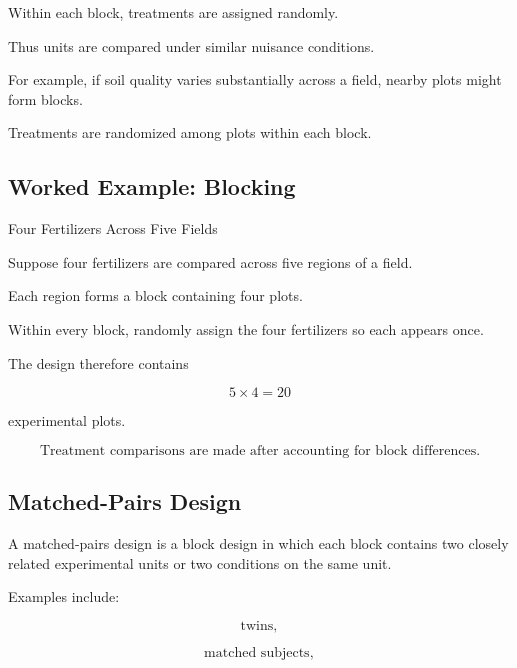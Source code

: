 Within each block, treatments are assigned randomly.

Thus units are compared under similar nuisance conditions.

For example, if soil quality varies substantially across a field, nearby
plots might form blocks.

Treatments are randomized among plots within each block.

\subsection{Worked Example: Blocking}
\label{subsec:worked-blocking-design}

\begin{workedexamplebox}{Four Fertilizers Across Five Fields}

Suppose four fertilizers are compared across five regions of a field.

Each region forms a block containing four plots.

Within every block, randomly assign the four fertilizers so each appears
once.

The design therefore contains

\[
5\times4=20
\]

experimental plots.

\begin{answerbox}
\[
\boxed{
\text{Treatment comparisons are made after accounting for block
differences.}
}
\]
\end{answerbox}

\end{workedexamplebox}

\subsection{Matched-Pairs Design}
\label{subsec:matched-pairs-design-experimental}

A matched-pairs design is a block design in which each block contains
two closely related experimental units or two conditions on the same
unit.

Examples include:

\[
\boxed{
\text{twins},
}
\]

\[
\boxed{
\text{matched subjects},
}
\]

